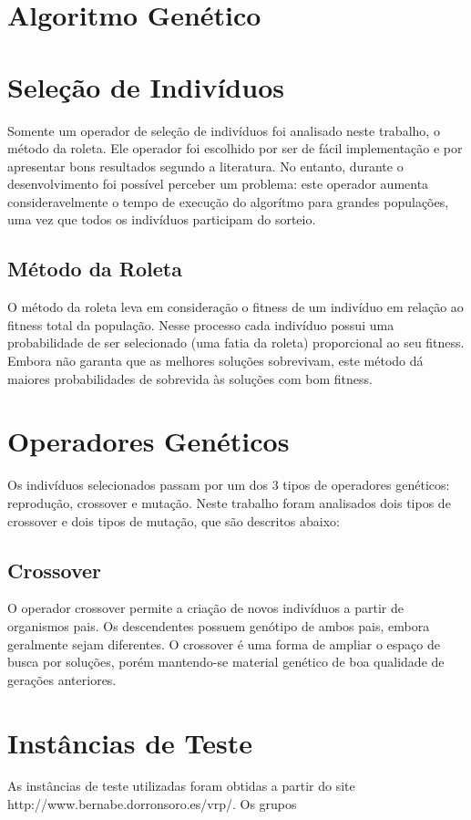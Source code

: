 \documentclass[conference]{IEEEtran}
\begin{document}
\section{Algoritmo Genético}

\section{Seleção de Indivíduos}
Somente um operador de seleção de indivíduos foi analisado neste trabalho, o
método da roleta. Ele operador foi escolhido por ser de fácil implementação e
por apresentar bons resultados segundo a literatura. No entanto, durante o
desenvolvimento foi possível perceber um problema: este operador aumenta
consideravelmente o tempo de execução do algorítmo para grandes populações, uma 
vez que todos os indivíduos participam do sorteio.

\subsection{Método da Roleta}
O método da roleta leva em consideração o fitness de um indivíduo em relação ao
fitness total da população. Nesse processo cada indivíduo possui uma 
probabilidade de ser selecionado (uma fatia da roleta) proporcional ao seu
fitness. Embora não garanta que as melhores soluções sobrevivam, este método
dá maiores probabilidades de sobrevida às soluções com bom fitness.

\section{Operadores Genéticos}
Os indivíduos selecionados passam por um dos 3 tipos de operadores
genéticos: reprodução, crossover e mutação. Neste trabalho foram analisados
dois tipos de crossover e dois tipos de mutação, que são descritos abaixo:\\

\subsection{Crossover}
O operador crossover permite a criação de novos indivíduos a partir de
organismos pais. Os descendentes possuem genótipo de ambos pais, embora
geralmente sejam diferentes. O crossover é uma forma de ampliar o espaço de
busca por soluções, porém mantendo-se material genético de boa qualidade de
gerações anteriores.


\section{Instâncias de Teste}
As instâncias de teste utilizadas foram obtidas a partir do site http://www.bernabe.dorronsoro.es/vrp/. Os grupos 
\end{document}

